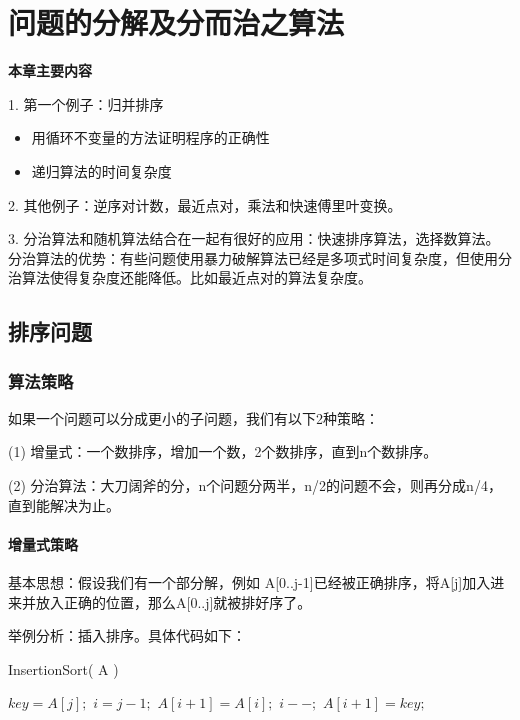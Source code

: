 \chapter{问题的分解及分而治之算法}

\textbf{本章主要内容}

1.	第一个例子：归并排序
\begin{itemize}
    \item   用循环不变量的方法证明程序的正确性
	\item   递归算法的时间复杂度
\end{itemize}

2.	其他例子：逆序对计数，最近点对，乘法和快速傅里叶变换。

3.	分治算法和随机算法结合在一起有很好的应用：快速排序算法，选择数算法。
分治算法的优势：有些问题使用暴力破解算法已经是多项式时间复杂度，但使用分治算法使得复杂度还能降低。比如最近点对的算法复杂度。

\section{排序问题}
\subsection{算法策略}

如果一个问题可以分成更小的子问题，我们有以下2种策略：

(1) 增量式：一个数排序，增加一个数，2个数排序，直到n个数排序。

(2) 分治算法：大刀阔斧的分，n个问题分两半，n/2的问题不会，则再分成n/4，直到能解决为止。

\subsubsection{增量式策略}
	
	基本思想：假设我们有一个部分解，例如 A[0..j-1]已经被正确排序，将A[j]加入进来并放入正确的位置，那么A[0..j]就被排好序了。
	
	举例分析：插入排序。具体代码如下：
	
\noindent
\begin{small}
{\sc InsertionSort}( A ) 
\begin{algorithmic}[1]
\STATE $key = A[j];$ 
\STATE $i = j - 1;$
\STATE $A[i+1] = A[i];$ 
\STATE $i--;$
\ENDWHILE
\STATE $A[i+1] = key;$
\ENDFOR
\end{algorithmic}
\end{small}

